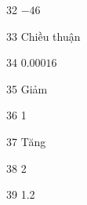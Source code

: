\begin{loigiaibt}{32}
 $-46$
\end{loigiaibt}
\begin{loigiaibt}{33}
 Chiều thuận
\end{loigiaibt}
\begin{loigiaibt}{34}
 $0.00016$
\end{loigiaibt}
\begin{loigiaibt}{35}
 Giảm
\end{loigiaibt}
\begin{loigiaibt}{36}
 1
\end{loigiaibt}
\begin{loigiaibt}{37}
 Tăng
\end{loigiaibt}
\begin{loigiaibt}{38}
 2
\end{loigiaibt}
\begin{loigiaibt}{39}
 1.2
\end{loigiaibt}
